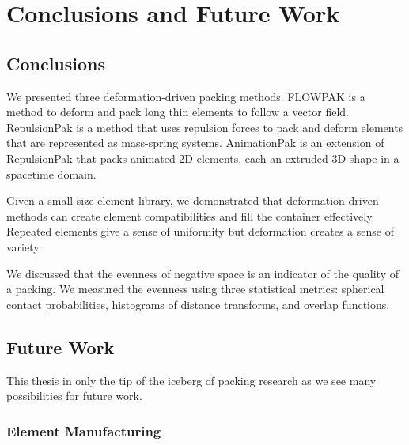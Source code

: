 
\chapter{Conclusions and Future Work}
\label{chapter_conclusions_and_future_work}

\section{Conclusions}

\newtext
{
We presented three deformation-driven packing methods.
FLOWPAK is a method to deform and pack long thin elements to follow a vector field.
RepulsionPak is a method that uses repulsion forces to pack and deform
elements that are represented as mass-spring systems.
AnimationPak is an extension of RepulsionPak that packs animated 2D elements,
each an extruded 3D shape in a spacetime domain.
}

\newtext
{
Given a small size element library, 
we demonstrated that deformation-driven methods can create element compatibilities
and fill the container effectively.
Repeated elements give a sense of uniformity but deformation creates a sense of variety.
}

\newtext
{
We discussed that the evenness of negative space is an indicator of the quality of a packing.
We measured the evenness using three statistical metrics:
spherical contact probabilities, histograms of distance transforms, and overlap functions.
}

\section{Future Work}

\newtext
{
This thesis in only the tip of the iceberg of packing research as
we see many possibilities for future work.
}


\subsection{Element Manufacturing}

